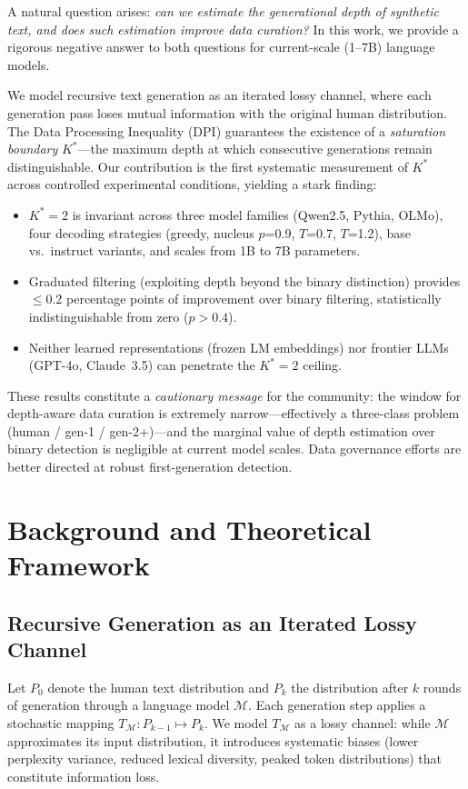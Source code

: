 \documentclass[11pt,a4paper]{article}
\begin{document}
A natural question arises: \emph{can we estimate the generational depth of synthetic text, and does such estimation improve data curation?}
In this work, we provide a rigorous negative answer to both questions for current-scale (1--7B) language models.

We model recursive text generation as an iterated lossy channel, where each generation pass loses mutual information with the original human distribution.
The Data Processing Inequality (DPI) guarantees the existence of a \emph{saturation boundary} $K^*$---the maximum depth at which consecutive generations remain distinguishable.
Our contribution is the first systematic measurement of $K^*$ across controlled experimental conditions, yielding a stark finding:

\begin{itemize}
    \item $K^*=2$ is invariant across three model families (Qwen2.5, Pythia, OLMo), four decoding strategies (greedy, nucleus $p$=0.9, $T$=0.7, $T$=1.2), base vs.\ instruct variants, and scales from 1B to 7B parameters.
    \item Graduated filtering (exploiting depth beyond the binary distinction) provides $\leq$0.2 percentage points of improvement over binary filtering, statistically indistinguishable from zero ($p>0.4$).
    \item Neither learned representations (frozen LM embeddings) nor frontier LLMs (GPT-4o, Claude~3.5) can penetrate the $K^*=2$ ceiling.
\end{itemize}

These results constitute a \emph{cautionary message} for the community: the window for depth-aware data curation is extremely narrow---effectively a three-class problem (human / gen-1 / gen-2+)---and the marginal value of depth estimation over binary detection is negligible at current model scales.
Data governance efforts are better directed at robust first-generation detection.

\section{Background and Theoretical Framework}

\subsection{Recursive Generation as an Iterated Lossy Channel}

Let $P_0$ denote the human text distribution and $P_k$ the distribution after $k$ rounds of generation through a language model $\mathcal{M}$.
Each generation step applies a stochastic mapping $T_\mathcal{M}: P_{k-1} \mapsto P_k$.
We model $T_\mathcal{M}$ as a lossy channel: while $\mathcal{M}$ approximates its input distribution, it introduces systematic biases (lower perplexity variance, reduced lexical diversity, peaked token distributions) that constitute information loss.
\end{document}
